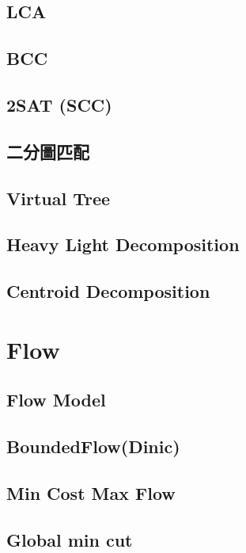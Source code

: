 \subsection{LCA}

\subsection{BCC}

\subsection{2SAT (SCC)}

\subsection{二分圖匹配}

\subsection{Virtual Tree}

\subsection{Heavy Light Decomposition}

\subsection{Centroid Decomposition}


\section{Flow}
\subsection{Flow Model}

\subsection{BoundedFlow(Dinic)}

\subsection{Min Cost Max Flow}

\subsection{Global min cut}

